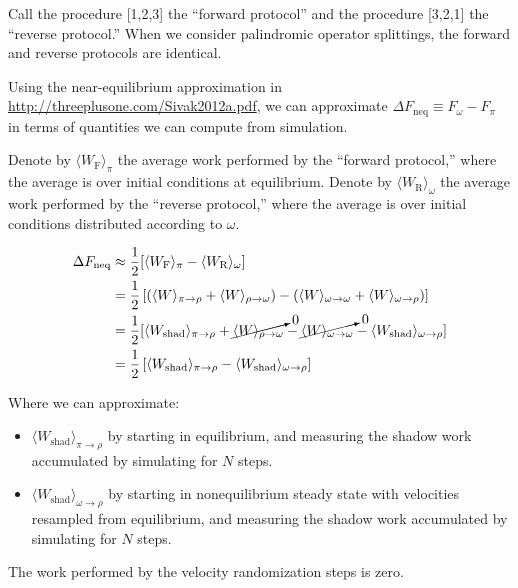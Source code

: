 \documentclass[11pt]{article}
\begin{document}
Call the procedure [1,2,3] the ``forward protocol'' and the procedure [3,2,1] the ``reverse protocol.'' When we consider palindromic operator splittings, the forward and reverse protocols are identical.

Using the near-equilibrium approximation in \url{http://threeplusone.com/Sivak2012a.pdf}, we can approximate $\Delta F_\text{neq} \equiv F_\omega - F_\pi$  in terms of quantities we can compute from simulation.

Denote by $\langle W_\text{F} \rangle_\pi$ the average work performed by the ``forward protocol,'' where the average is over initial conditions at equilibrium. Denote by $\langle W_\text{R} \rangle_\omega$ the average work performed by the ``reverse protocol,'' where the average is over initial conditions distributed according to $\omega$.

$$\begin{aligned}
\Delta F_\text{neq}
& \approx
\frac{1}{2} [ \langle W_\text{F} \rangle_\pi - \langle W_\text{R} \rangle_\omega ]\\
&= \frac{1}{2}
\left[
\left(
\langle W \rangle_{\pi \to \rho}
+ \langle W \rangle_{\rho \to \omega}
\right)
- \left(
\langle W \rangle_{\omega \to \omega} + 
\langle W \rangle_{\omega \to \rho}
\right)
\right]\\
&= \frac{1}{2} [
\langle W_\text{shad} \rangle_{\pi \to \rho}
+ \cancelto{0}{\langle W \rangle_{\rho \to \omega}}
- 
\cancelto{0}{\langle W \rangle_{\omega \to \omega}} 
- 
\langle W_\text{shad} \rangle_{\omega \to \rho} ]\\
&= \frac{1}{2} \left[
\langle W_\text{shad} \rangle_{\pi \to \rho}
- \langle W_\text{shad} \rangle_{\omega \to \rho} \right]\\
\end{aligned}$$

Where we can approximate:
\begin{itemize}
\item $\langle W_\text{shad} \rangle_{\pi \to \rho}$ by starting in equilibrium, and measuring the shadow work accumulated by simulating for $N$ steps.
\item $\langle W_\text{shad} \rangle_{\omega \to \rho}$ by starting in nonequilibrium steady state with velocities resampled from equilibrium, and measuring the shadow work accumulated by simulating for $N$ steps.
\end{itemize}

The work performed by the velocity randomization steps is zero.
\end{document}

